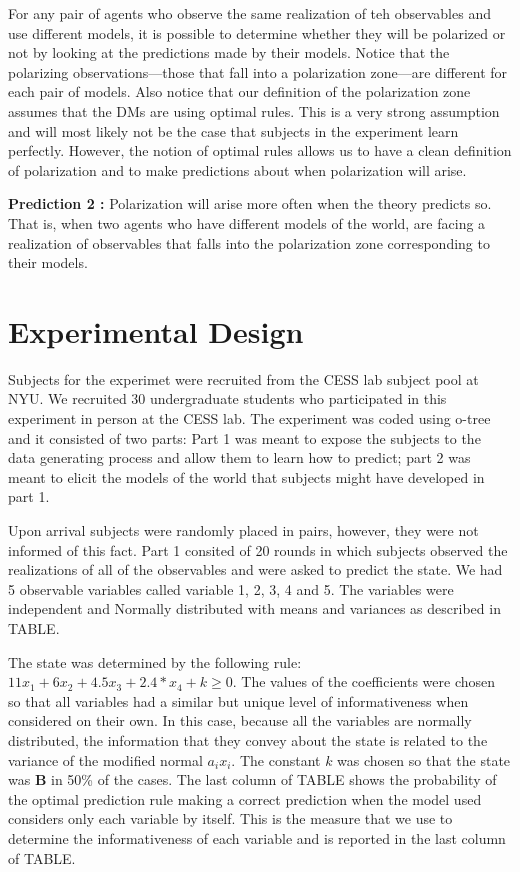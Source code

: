 \documentclass[
  12pt,
]{article}
\begin{document}
For any pair of agents who observe the same realization of teh
observables and use different models, it is possible to determine
whether they will be polarized or not by looking at the predictions made
by their models. Notice that the polarizing observations---those that
fall into a polarization zone---are different for each pair of models.
Also notice that our definition of the polarization zone assumes that
the DMs are using optimal rules. This is a very strong assumption and
will most likely not be the case that subjects in the experiment learn
perfectly. However, the notion of optimal rules allows us to have a
clean definition of polarization and to make predictions about when
polarization will arise.

\textbf{Prediction 2 :} Polarization will arise more often when the
theory predicts so. That is, when two agents who have different models
of the world, are facing a realization of observables that falls into
the polarization zone corresponding to their models.

\hypertarget{experimental-design}{%
\section{Experimental Design}\label{experimental-design}}

Subjects for the experimet were recruited from the CESS lab subject pool
at NYU. We recruited 30 undergraduate students who participated in this
experiment in person at the CESS lab. The experiment was coded using
o-tree \citet{otree} and it consisted of two parts: Part 1 was meant to
expose the subjects to the data generating process and allow them to
learn how to predict; part 2 was meant to elicit the models of the world
that subjects might have developed in part 1.

Upon arrival subjects were randomly placed in pairs, however, they were
not informed of this fact. Part 1 consited of 20 rounds in which
subjects observed the realizations of all of the observables and were
asked to predict the state. We had 5 observable variables called
variable 1, 2, 3, 4 and 5. The variables were independent and Normally
distributed with means and variances as described in TABLE.

The state was determined by the following rule:
\(11x_1+6x_2+4.5x_3+2.4*x_4+k \geq 0\). The values of the coefficients
were chosen so that all variables had a similar but unique level of
informativeness when considered on their own. In this case, because all
the variables are normally distributed, the information that they convey
about the state is related to the variance of the modified normal
\(a_ix_i\). The constant \(k\) was chosen so that the state was
\textbf{B} in 50\% of the cases. The last column of TABLE shows the
probability of the optimal prediction rule making a correct prediction
when the model used considers only each variable by itself. This is the
measure that we use to determine the informativeness of each variable
and is reported in the last column of TABLE.
\end{document}
